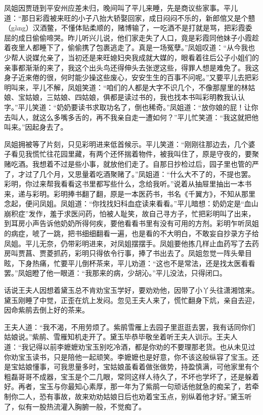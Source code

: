 \documentclass[12pt,oneside]{book}
\begin{document}
凤姐因贾琏到平安州应差未归，晚间叫了平儿来睡，先是商议些家事。平儿道：“那日彩霞被来旺的小子八抬大轿娶回家，成日闷闷不乐的，新郎倌又是个戆（gàng）汉酒鳖，不懂体贴柔顺的，赌博输了，一吃酒不是打就是骂，把彩霞委屈的成日偷偷啼哭。昨儿听兴儿说，他们家走失了人口，竟是彩霞同他妹子小霞趁着夜里人都睡下了，偷偷携了包裹逃走了。真是一场冤孽。”凤姐叹道：“从今我也少帮人说媒允亲了，当初还是来旺媳妇央我成就大媒的，眼看着往后公子小姐们的亲事都渐渐的来了，我这个出头鸟还得伸头去张逻这些，得罪人想是难免了。我这身子近来倦的很，何时能少操这些废心，安安生生的百事不问呢。”又要平儿去把彩明叫来，平儿不解，凤姐笑道：“咱们的人都是大字不识几个，不像那屋里的林姑娘、宝姑娘，三姑娘、四姑娘，俱都是读过书的，我也找本书叫彩明教我认认字。”平儿笑道：“奶奶要读书求取功名了，倒也稀奇。”凤姐道：“放你娘的屁！让你去叫人，就这么多嘴多舌的，再不我亲自走一遭如何？”平儿忙笑道：“我这就把他叫来。”因起身去了。

凤姐拥被等了片刻，只见彩明进来低首候示。平儿笑道：“刚刚往那边去，几个婆子看见我慌忙往花园里藏，有两个还怀揣着物件，被我叫住了，原是守夜的，要聚赌吃酒。我想着不过是些小事，就放他们走了。自那日抄检过后，园子里也管的严了，才过了几个月，又思量着吃酒聚赌了。”凤姐道：“什么大不了的，不提也罢。彩明，你过来帮我看看这书里都写些什么，念给我听。”说着从抽屉里抽出一本书来，递与彩明。彩明捧书翻了翻，原是一本医药书，书名《千翼方》，不知从那里念起，便问凤姐。凤姐道：“你找找妇科血症读来看看。”平儿暗想：奶奶定是“血山崩积症”发作，羞于求医问药，怕被人耻笑，故自己寻方子，忙把彩明叫了出来，到耳房小声告诉他奶奶所得何疾，要他看看书里有没有可用的方剂。彩明乍听凤姐的病症，唬了一跳，把书细细翻看一遍，也是看的不大明白，不敢妄自抄录方子给凤姐。平儿无奈，仍带彩明进来，对凤姐摆摆手。凤姐要他拣几样止血药写了去药房叫贾菖、贾菱抓药，彩明只得依令行事，捧了书出去了。凤姐忽觉一阵头晕目眩，下身热痛，忙要平儿倒杯茶来，平儿劝道：“这也不是常法，还是找太医看看罢。”凤姐瞪了他一眼道：“我那来的病，少胡沁。”平儿没法，只得闭口。

话说王夫人因想着黛玉总不肯劝宝玉学好，要劝劝他，因带了小丫头往潇湘馆来。黛玉刚睡了中觉，正歪在炕上发闷。忽见王夫人来了，慌忙翻身下炕，亲自去迎，因命紫鹃去倒上好的茶来。

王夫人道：“我不渴，不用劳烦了。紫鹃雪雁上去园子里逛逛去罢，我有话同你们姑娘说。”紫鹃、雪雁知机走开了。黛玉毕恭毕敬坐着听王夫人训示。王夫人道：“我记得以前李嬷嬷劝宝玉别吃冷酒，都是你劝的不要理那老货。也从未见过你劝宝玉读书，只是陪他一起顽笑。李嬷嬷也是好意，你不该这般纵容了宝玉。还是宝姑娘懂事，可我思量多时，宝姑娘虽看着做张做势，持盈慎满，可他家里有个粗磊哥哥不成器，宝玉是个二几眼，常同这样人待久了，不坏也学坏了，还是躲着好。再者，宝玉与你最知心素厚，那一年为了紫鹃一句顽话他就急的痴呆了，若牵制你二人，恐有事故，故来劝劝姑娘日后也劝着宝玉点，别纵着他才好。”黛玉听了，似有一股热流灌入胸腑一般，不觉痴了。
\end{document}
